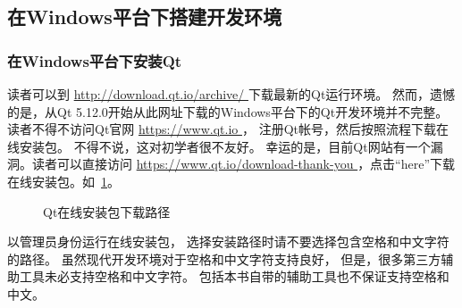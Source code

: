 ﻿




%

\FloatBarrier
\subsection{
在Windows平台下搭建开发环境
}\label{s000110}


\FloatBarrier
\subsubsection{
在Windows平台下安装Qt
}\label{ss000110}


读者可以到 \url{http://download.qt.io/archive/
}
下载最新的Qt运行环境。
然而，遗憾的是，从Qt 5.12.0开始从此网址下载的Windows平台下的Qt开发环境并不完整。
读者不得不访问Qt官网 \url{https://www.qt.io
}，
注册Qt帐号，然后按照流程下载在线安装包。
不得不说，这对初学者很不友好。
幸运的是，目前Qt网站有一个漏洞。读者可以直接访问
 \url{https://www.qt.io/download-thank-you
}，点击“here”下载在线安装包。如\figurename\ \ref{p000000}。
\begin{figure}[htb] %
\marginnote{\setlength\fboxsep{2pt}\fbox{\footnotesize{\kaishu\figurename\,}\footnotesize{\ref{p000000}}}}\centering %
\setlength\fboxsep{-1pt} %
\caption{Qt在线安装包下载路径} %
\label{p000000} %
\end{figure}

以管理员身份运行在线安装包，
选择安装路径时请不要选择包含空格和中文字符的路径。
虽然现代开发环境对于空格和中文字符支持良好，
但是，很多第三方辅助工具未必支持空格和中文字符。
包括本书自带的辅助工具也不保证支持空格和中文。

